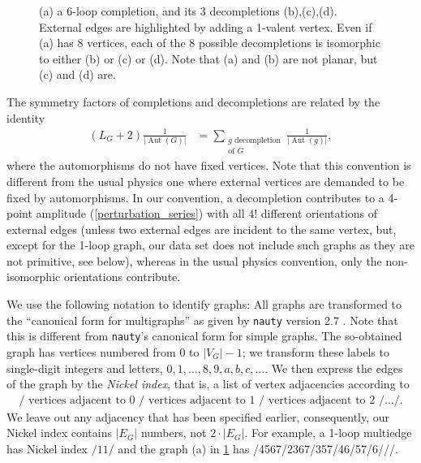 \documentclass[11pt,a4paper]{article}
\newcommand{\abs}[1]{\lvert #1 \rvert}
\newcommand{\Aut}{\operatorname{Aut}}
\renewcommand{\|}{\rule[-0.4ex]{0.2ex}{1.2em}}
\begin{document}
\begin{figure}[htb]
	\caption{(a) a 6-loop completion, and its 3  decompletions (b),(c),(d). External edges are highlighted by adding a 1-valent vertex. Even if (a) has 8 vertices, each of the 8 possible decompletions is isomorphic to either (b) or  (c) or (d). Note that (a) and (b) are not planar, but (c) and (d) are.}
	\label{fig:completion_decompletion}
\end{figure}



The symmetry factors of completions and decompletions are related by the identity
\begin{align}\label{aut_decompletion}
	\left( L_G+2 \right) \frac{1}{\abs{\Aut(G)}} &=\sum_{ \substack{g \text{ decompletion}\\\text{of } G}} \frac{1}{\abs{\Aut(g)}}   ,
\end{align}
where the automorphisms do not have fixed vertices. Note that this convention is different from the usual physics one  where external vertices are demanded to be fixed by automorphisms. In our convention, a decompletion contributes to a 4-point amplitude (\cref{perturbation_series}) with all $4!$ different orientations of external edges (unless two external edges are incident to the same vertex, but, except for the 1-loop graph, our data set does not include such graphs as they are not primitive, see below), whereas in the usual physics convention, only the non-isomorphic orientations contribute. 


We use the following notation to identify graphs: All graphs are transformed to the \enquote{canonical form for multigraphs} as given by \texttt{nauty} version 2.7 \cite{mckay_practical_2014}. Note that this is different from \texttt{nauty}'s canonical form for simple graphs.  The so-obtained graph has vertices numbered from $0$ to $\abs{V_G}-1$; we transform these labels to single-digit integers and letters, $0,1,\ldots,8,9,a,b,c,\ldots$. We then express the edges of the graph by the  \emph{Nickel index}\cite{nickel_compilation_1977}, that is, a list of vertex adjacencies according to
\begin{align}\label{def:nickel}
	/ \text{ vertices adjacent to 0 }/\text{ vertices adjacent to 1 }/\text{ vertices adjacent to 2 }/\ldots/.
\end{align}
We leave out any adjacency that has been specified earlier, consequently, our Nickel index contains $\abs{E_G}$ numbers, not $2\cdot \abs{E_G}$.
For example, a 1-loop multiedge has Nickel index $/11/$ and  the graph (a)  in \cref{fig:completion_decompletion} has  /4567/2367/357/46/57/6///.
\end{document}
